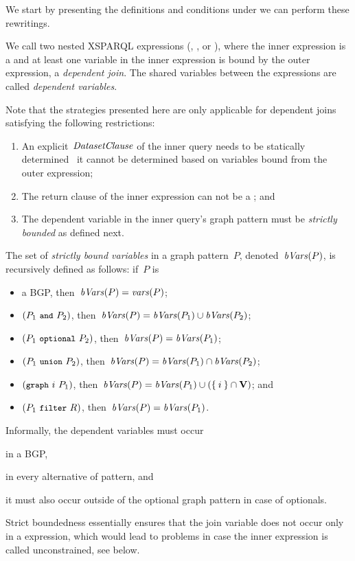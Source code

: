 We start by presenting the definitions and conditions under we can perform these rewritings.
%
\begin{definition}
  We call two nested XSPARQL \FOR expressions (\ForClause, \SparqlForClause, or \SQLForClause), where the inner
  expression is a \SparqlForClause and at least one variable in the inner expression is bound by the outer expression, a
  \emph{dependent join}.  The shared variables between the \FOR expressions are called \emph{dependent variables}.
\end{definition}
%
\noindent Note that the strategies presented here are only applicable for dependent joins satisfying the following restrictions:
%
\begin{enumerate}[noitemsep]
\item An explicit~${\textit{Da\-ta\-set\-Clau\-se}}$ of the inner query needs to be statically determined \ie~it cannot be determined
  based on variables bound from the outer expression;
\item The return clause of the inner expression can not be a \ConstructClause; and
\item The dependent variable in the inner query's graph pattern must be \emph{strictly bounded} as defined next.
\end{enumerate}
%
\begin{definition}
  The set of \emph{strictly bound variables} in a graph pattern~$P$,
  denoted~$\mathit{bVars}(P)$, is recursively defined as follows: if~$P$ is
  \begin{itemize}[nosep]
  \item a \ac{BGP}, then~$\mathit{bVars}(P) = \mathit{vars}\!\left(P\right)$;
  \item $(P_1~\texttt{{\small and}}~P_2)$, then~$\mathit{bVars}(P) = \mathit{bVars}(P_1) \cup \mathit{bVars}(P_2)$;
  \item $(P_1~\texttt{{\small optional}}~P_2)$, then~$\mathit{bVars}(P) = \mathit{bVars}(P_1)$;
  \item $(P_1~\texttt{{\small union}}~P_2)$, then~$\mathit{bVars}(P) = \mathit{bVars}(P_1) \cap \mathit{bVars}(P_2)$;
  \item $(\texttt{{\small graph}}~i~P_1)$, then~$\mathit{bVars}(P) = \mathit{bVars}(P_1) \cup (\left\{\:i\:\right\} \cap\mathbf{V})$; and
  \item $(P_1~\texttt{{\small filter}}~R)$, then~$\mathit{bVars}(P) = \mathit{bVars}(P_1)$.
  \end{itemize}
\end{definition}
%
Informally, the dependent variables must occur
\begin{inparaenum}[(i)]
\item in a \ac{BGP},
\item in every alternative of  pattern, and 
\item it must also occur outside of the optional graph pattern in case of optionals.
\end{inparaenum}
% 
Strict boundedness essentially ensures that the join variable does not occur only in a \FILTER expression, which would
lead to problems in case the inner expression is called unconstrained, see below.

